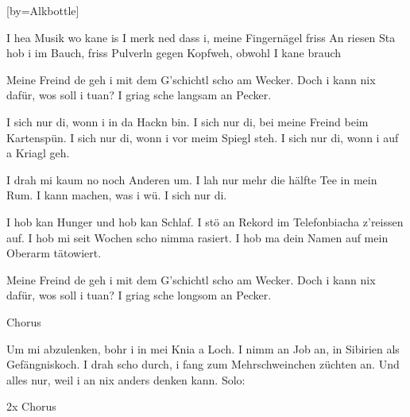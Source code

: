 
[by={Alkbottle}]

\chordson

\beginverse
I hea Musik wo kane is
I merk ned dass i, meine Fingernägel friss
An riesen Sta hob i im Bauch,
friss Pulverln gegen Kopfweh, obwohl I kane brauch

Meine Freind de geh i mit dem G'schichtl scho am Wecker.
Doch i kann nix dafür, wos soll i tuan? I griag sche langsam an Pecker.
\endverse

\beginchorus
I sich nur di, wonn i in da Hackn bin.
I sich nur di, bei meine Freind beim Kartenspün.
I sich nur di, wonn i vor meim Spiegl steh.
I sich nur di, wonn i auf a Kriagl geh.

I drah mi kaum no noch Anderen um.
I lah nur mehr die hälfte Tee in mein Rum.
I kann machen, was i wü. I sich nur di.
\endchorus


\beginverse

I hob kan Hunger und hob kan Schlaf.
I stö an Rekord im Telefonbiacha z'reissen auf.
I hob mi seit Wochen scho nimma rasiert.
I hob ma dein Namen auf mein Oberarm tätowiert.

Meine Freind de geh i mit dem G'schichtl scho am Wecker.
Doch i kann nix dafür, wos soll i tuan? I griag sche longsom an Pecker.
\endverse


\beginchorus
Chorus
\endchorus


\beginverse
Um mi abzulenken, bohr i in mei Knia a Loch.
I nimm an Job an, in Sibirien als Gefängniskoch.
I drah scho durch, i fang zum Mehrschweinchen züchten an.
Und alles nur, weil i an nix anders denken kann.
Solo:
\endverse


\beginchorus
2x Chorus
\endchorus
\endsong
